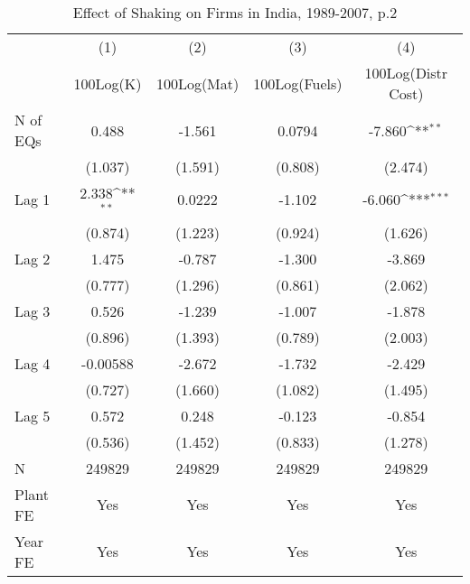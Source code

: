 \begin{table}[htbp]\centering
\def\sym#1{\ifmmode^{#1}\else\(^{#1}\)\fi}
\caption{Effect of Shaking on Firms in India, 1989-2007, p.2}
\begin{tabular}{l*{4}{c}}
\toprule
                &\multicolumn{1}{c}{(1)}&\multicolumn{1}{c}{(2)}&\multicolumn{1}{c}{(3)}&\multicolumn{1}{c}{(4)}\\
                &\multicolumn{1}{c}{100Log(K)}&\multicolumn{1}{c}{100Log(Mat)}&\multicolumn{1}{c}{100Log(Fuels)}&\multicolumn{1}{c}{100Log(Distr Cost)}\\
\midrule
N of EQs        &    0.488         &   -1.561         &   0.0794         &   -7.860\sym{**} \\
                &  (1.037)         &  (1.591)         &  (0.808)         &  (2.474)         \\
\addlinespace
Lag 1           &    2.338\sym{**} &   0.0222         &   -1.102         &   -6.060\sym{***}\\
                &  (0.874)         &  (1.223)         &  (0.924)         &  (1.626)         \\
\addlinespace
Lag 2           &    1.475         &   -0.787         &   -1.300         &   -3.869         \\
                &  (0.777)         &  (1.296)         &  (0.861)         &  (2.062)         \\
\addlinespace
Lag 3           &    0.526         &   -1.239         &   -1.007         &   -1.878         \\
                &  (0.896)         &  (1.393)         &  (0.789)         &  (2.003)         \\
\addlinespace
Lag 4           & -0.00588         &   -2.672         &   -1.732         &   -2.429         \\
                &  (0.727)         &  (1.660)         &  (1.082)         &  (1.495)         \\
\addlinespace
Lag 5           &    0.572         &    0.248         &   -0.123         &   -0.854         \\
                &  (0.536)         &  (1.452)         &  (0.833)         &  (1.278)         \\
\midrule
N               &   249829         &   249829         &   249829         &   249829         \\
Plant FE        &      Yes         &      Yes         &      Yes         &      Yes         \\
Year FE         &      Yes         &      Yes         &      Yes         &      Yes         \\

\end{tabular}
\end{table}
